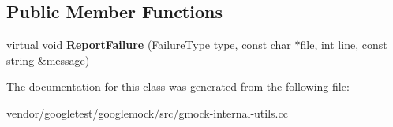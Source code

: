 \subsection*{Public Member Functions}
\begin{DoxyCompactItemize}
\item 
\mbox{\label{classtesting_1_1internal_1_1_google_test_failure_reporter_a9b2f81e6c5b6e9f618fd75cc3e27e94c}} 
virtual void {\bfseries Report\+Failure} (Failure\+Type type, const char $\ast$file, int line, const string \&message)
\end{DoxyCompactItemize}


The documentation for this class was generated from the following file\+:\begin{DoxyCompactItemize}
\item 
vendor/googletest/googlemock/src/gmock-\/internal-\/utils.\+cc\end{DoxyCompactItemize}
